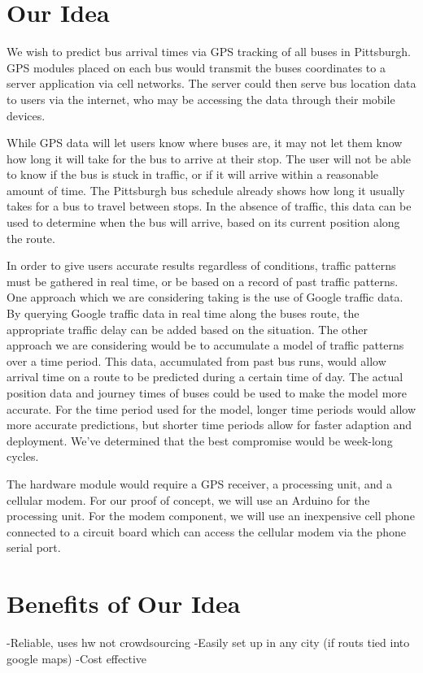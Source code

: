 \documentclass[pageno]{jpaper}
\begin{document}
\section{Our Idea}

We wish to predict bus arrival times via GPS tracking of all buses in Pittsburgh.
GPS modules placed on each bus would transmit the buses coordinates to a server
application via cell networks. The server could then serve bus location data
to users via the internet, who may be accessing the data through their mobile
devices.

While GPS data will let users know where buses are, it may not let them
know how long it will take for the bus to arrive at their stop. The user will
not be able to know if the bus is stuck in traffic, or if it will arrive within
a reasonable amount of time. The Pittsburgh bus schedule already shows how long
it usually takes for a bus to travel between stops. In the absence of traffic,
this data can be used to determine when the bus will arrive, based on its current
position along the route.

In order to give users accurate results regardless of conditions, traffic patterns
must be gathered in real time, or be based on a record of past traffic patterns.
One approach which we are considering taking is the use of Google traffic data.
By querying Google traffic data in real time along the buses route, the
appropriate traffic delay can be added based on the situation. The other approach
we are considering would be to accumulate a model of traffic patterns over a 
time period. This data, accumulated from past bus runs, would allow arrival time
on a route to be predicted during a certain time of day. The actual position
data and journey times of buses could be used to make the model more accurate. 
For the time period used for the model, longer time periods would allow more 
accurate predictions, but shorter time periods allow for faster adaption and 
deployment. We've determined that the best compromise would be week-long cycles.

The hardware module would require a GPS receiver, a processing unit, and a
cellular modem. For our proof of concept, we will use an Arduino for the
processing unit. For the modem component, we will use an inexpensive cell
phone connected to a circuit board which can access the cellular modem
via the phone serial port.

\section{Benefits of Our Idea}

-Reliable, uses hw not crowdsourcing
-Easily set up in any city (if routs tied into google maps)
-Cost effective



\end{document}
